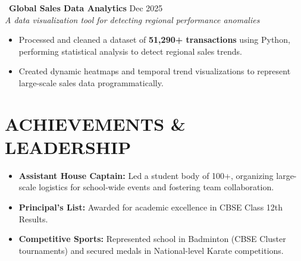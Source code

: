 \documentclass[a4paper,10pt]{article}
\begin{document}
\vspace{4pt}
\noindent\
{\textbf{Global Sales Data Analytics}} \href{https://doniljaison.github.io/product-sales-analytics/}{\small\faExternalLink*} \hfill Dec 2025 \\
\textit{A data visualization tool for detecting regional performance anomalies}
\begin{itemize}
    \item Processed and cleaned a dataset of \textbf{51,290+ transactions} using Python, performing statistical analysis to detect regional sales trends.
    \item Created dynamic heatmaps and temporal trend visualizations to represent large-scale sales data programmatically.
\end{itemize}

\section*{ACHIEVEMENTS \& LEADERSHIP}
\begin{itemize}
    \item \textbf{Assistant House Captain:} Led a student body of 100+, organizing large-scale logistics for school-wide events and fostering team collaboration.
    \item \textbf{Principal's List:} Awarded for academic excellence in CBSE Class 12th Results.
    \item \textbf{Competitive Sports:} Represented school in Badminton (CBSE Cluster tournaments) and secured medals in National-level Karate competitions.
\end{itemize}
\end{document}
